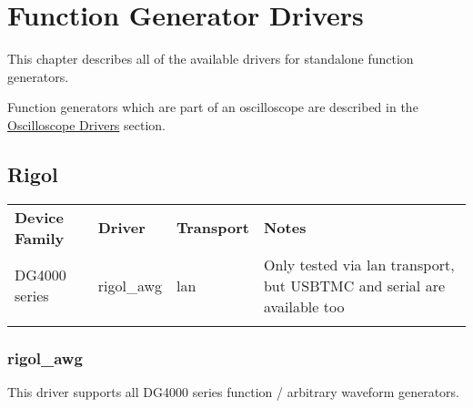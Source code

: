 \chapter{Function Generator Drivers}
\label{sec:funcgen-drivers}

This chapter describes all of the available drivers for standalone function generators.

Function generators which are part of an oscilloscope are described in the \hyperref[sec:scope-drivers]{Oscilloscope
Drivers} section.

\section{Rigol}

\begin{tabularx}{16cm}{lllX}
\thickhline
\textbf{Device Family} & \textbf{Driver} & \textbf{Transport} & \textbf{Notes} \\
\thickhline
DG4000 series & rigol\_awg & lan & Only tested via lan transport, but USBTMC and serial are available too\\
\thickhline
\end{tabularx}

\subsection{rigol\_awg}

This driver supports all DG4000 series function / arbitrary waveform generators.

